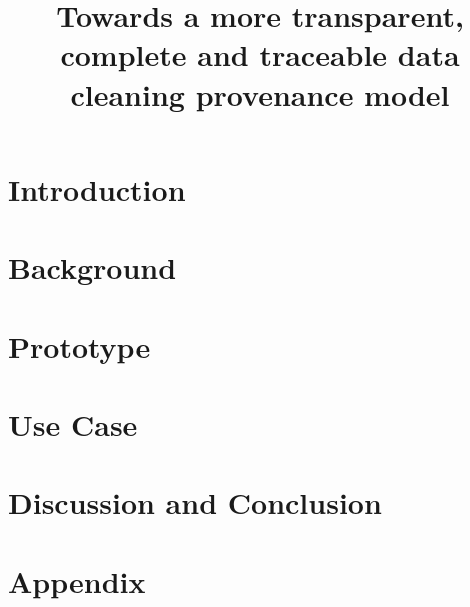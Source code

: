 \documentclass[11pt,fullpage]{article}
\begin{document}
\title{Towards a more transparent, complete and traceable data cleaning provenance model}

\maketitle


\begin{abstract}

\end{abstract}

\section{Introduction}



\section{Background}



\section{Prototype}
\label{prototype}



\section{Use Case}
\label{usecase}



\section{Discussion and Conclusion}





\section{Appendix}

\end{document}
